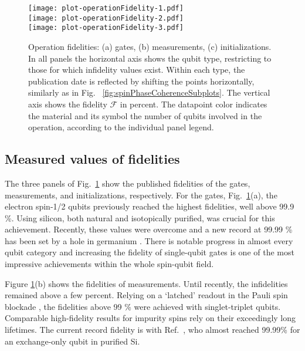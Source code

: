 \documentclass[aps, prx, showpacs, twocolumn, superscriptaddress, notitlepage, longbibliography, floatfix, nofootinbib]{revtex4-2}
\newcommand{\recheck}[1]{{#1}}
\begin{document}
\begin{figure}[ht!]
  \texttt{[image: plot-operationFidelity-1.pdf]} \hfill\\
  \texttt{[image: plot-operationFidelity-2.pdf]} \hfill\\
  \texttt{[image: plot-operationFidelity-3.pdf]} \hfill\\
  \caption{
    \label{fig:operationInfidelities}
  Operation fidelities: (a) gates, (b) measurements, (c) initializations. In all panels the horizontal axis shows the qubit type, restricting to those for which infidelity values exist. Within each type, the publication date is reflected by shifting the points horizontally, similarly as in Fig. ~\ref{fig:spinPhaseCoherenceSubplots}. The vertical axis shows the fidelity $\mathcal{F}$ in percent. The datapoint color indicates the material and its symbol the number of qubits involved in the operation, according to the individual panel legend.
  }
\end{figure}

\subsection{Measured values of fidelities}

The three panels of Fig.~\ref{fig:operationInfidelities} show the published fidelities of the gates, measurements, and initializations, respectively. For the gates, Fig.~\ref{fig:operationInfidelities}(a), \recheck{the electron spin-1/2 qubits previously reached the highest fidelities, well above 99.9 \%. Using silicon, both natural and isotopically purified, was crucial for this achievement. Recently, these values were overcome and a new record at 99.99 \% has been set by a hole in germanium \cite{lawrie_simultaneous_2021}.} \recheck{There is notable progress in almost every qubit category} and increasing the fidelity of single-qubit gates is one of the most impressive achievements within the whole spin-qubit field. 

Figure \ref{fig:operationInfidelities}(b) shows the fidelities of measurements. \recheck{Until recently, the infidelities remained above a few percent.} \recheck{Relying on a `latched' readout in the Pauli spin blockade \cite{nakajima_robust_2017,broome_high-fidelity_2017}, the fidelities above 99 \% were achieved with singlet-triplet qubits. Comparable high-fidelity results for impurity spins rely on their exceedingly long lifetimes. The current record fidelity is with Ref.~\cite{blumoff_fast_2022}, who almost reached 99.99\% for an exchange-only qubit in purified Si.}
\end{document}
